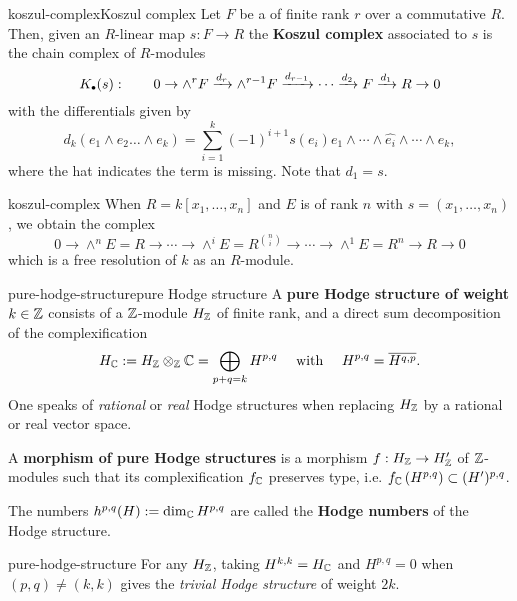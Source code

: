 \begin{topic}{koszul-complex}{Koszul complex}
    Let $F$ be a  of finite rank $r$ over a commutative  $R$. Then, given an $R$-linear map $s : F \to R$ the \textbf{Koszul complex} associated to $s$ is the chain complex of $R$-modules
    \[ K_\bdot(s) : \qquad 0 \to \wedge^r F \xrightarrow{d_r} \wedge^{r - 1} F \xrightarrow{d_{r - 1}} \cdots \xrightarrow{d_2} F \xrightarrow{d_1} R \to 0 \]
    with the differentials given by
    \[ d_k(e_1 \wedge e_2 \ldots \wedge e_k) = \sum_{i = 1}^{k} (-1)^{i + 1} s(e_i) e_1 \wedge \cdots \wedge \hat{e_i} \wedge \cdots \wedge e_k , \]
    where the hat indicates the term is missing. Note that $d_1 = s$.
\end{topic}

\begin{example}{koszul-complex}
    When $R = k[x_1, \ldots, x_n]$ and $E$ is of rank $n$ with $s = (x_1, \ldots, x_n)$, we obtain the complex 
    \[ 0 \to \wedge^n E = R \to \cdots \to \wedge^i E = R^{\binom{n}{i}} \to \cdots \to \wedge^1 E = R^n \to R \to 0 \]
    which is a free resolution of $k$ as an $R$-module.
\end{example}

\begin{topic}{pure-hodge-structure}{pure Hodge structure}
    A \textbf{pure Hodge structure of weight $k \in \mathbb{Z}$} consists of a $\mathbb{Z}$-module $H_{\mathbb{Z}}$ of finite rank, and a direct sum decomposition of the complexification
    \[ H_{\mathbb{C}} := H_{\mathbb{Z}} \otimes_{\mathbb{Z}} \mathbb{C} = \bigoplus_{p + q = k} H^{p, q} \quad \text{ with } \quad H^{p, q} = \overline{H^{q, p}} . \]
    One speaks of \textit{rational} or \textit{real} Hodge structures when replacing $H_{\mathbb{Z}}$ by a rational or real vector space.
    
    A \textbf{morphism of pure Hodge structures} is a morphism $f : H_{\mathbb{Z}} \to H'_{\mathbb{Z}}$ of $\mathbb{Z}$-modules such that its complexification $f_{\mathbb{C}}$ preserves type, i.e. $f_{\mathbb{C}}\left(H^{p, q}\right) \subset (H')^{p, q}$.
    
    The numbers $h^{p, q}(H) := \dim_{\mathbb{C}} H^{p, q}$ are called the \textbf{Hodge numbers} of the Hodge structure.
\end{topic}

\begin{example}{pure-hodge-structure}
    For any $H_{\mathbb{Z}}$, taking $H^{k,k} = H_{\mathbb{C}}$ and $H^{p, q} = 0$ when $(p, q) \ne (k, k)$ gives the \textit{trivial Hodge structure} of weight $2k$.
\end{example}

